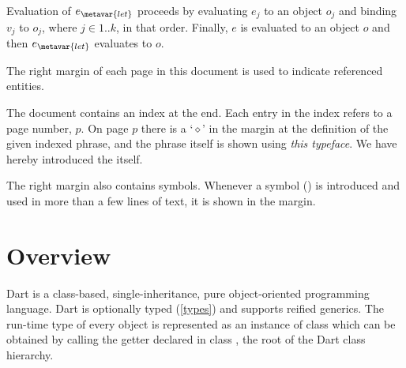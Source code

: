 \documentclass[makeidx]{article}
\begin{document}

\LMHash{}%
Evaluation of $e_{\metavar{let}}$ proceeds by
evaluating $e_j$ to an object $o_j$ and binding $v_j$ to $o_j$,
where $j \in 1 .. k$, in that order.
Finally, $e$ is evaluated to an object $o$ and then
$e_{\metavar{let}}$ evaluates to $o$.

\LMHash{}%
The right margin of each page in this document is used to indicate
referenced entities.

\LMHash{}%
The document contains an index at the end.
Each entry in the index refers to a page number, $p$.
On page $p$ there is a `$\diamond$' in the margin
at the definition of the given indexed phrase,
and the phrase itself is shown using \emph{this typeface}.
We have hereby introduced the
itself.

\LMHash{}%
The right margin also contains symbols.
Whenever a symbol
\BlindDefineSymbol{\textcolor{commentaryColor}{C}}%
\BlindDefineSymbol{\textcolor{commentaryColor}{x_j}}%
()
is introduced and used in more than a few lines of text,
it is shown in the margin.



\section{Overview}

\LMHash{}%
Dart is a class-based, single-inheritance, pure
object-oriented programming language.
Dart is optionally typed (\ref{types}) and supports reified generics.
The run-time type of every object is represented as
an instance of class  which can be obtained
by calling the getter  declared in class ,
the root of the Dart class hierarchy.
\end{document}
